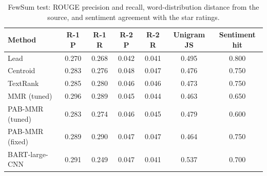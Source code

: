 \begin{table}[H]
\centering
\footnotesize
\caption{FewSum test: ROUGE precision and recall, word-distribution distance from the source, and sentiment agreement with the star ratings.}
\label{tab:fewsumdetail}
\begin{tabular}{lcccccc}
\toprule
Method & R-1 P & R-1 R & R-2 P & R-2 R & Unigram JS & Sentiment hit \\
\midrule
Lead & 0.270 & 0.268 & 0.042 & 0.041 & 0.495 & 0.800 \\
Centroid & 0.283 & 0.276 & 0.048 & 0.047 & 0.476 & 0.750 \\
TextRank & 0.285 & 0.280 & 0.046 & 0.046 & 0.473 & 0.750 \\
MMR (tuned) & 0.296 & 0.289 & 0.045 & 0.044 & 0.463 & 0.650 \\
PAB-MMR (tuned) & 0.283 & 0.274 & 0.046 & 0.045 & 0.479 & 0.600 \\
PAB-MMR (fixed) & 0.289 & 0.290 & 0.047 & 0.047 & 0.464 & 0.750 \\
BART-large-CNN & 0.291 & 0.249 & 0.047 & 0.041 & 0.537 & 0.700 \\
\bottomrule
\end{tabular}
\end{table}